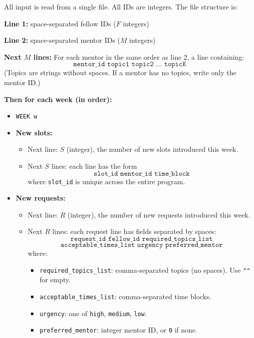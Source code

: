 \documentclass[12pt]{article}
\begin{document}
All input is read from a single file. All IDs are integers. The file structure is:

\bigskip
\noindent\textbf{Line 1:} space-separated fellow IDs ($F$ integers)

\noindent\textbf{Line 2:} space-separated mentor IDs ($M$ integers)

\noindent\textbf{Next $M$ lines:} For each mentor in the same order as line 2, a line containing:
\[
\texttt{mentor\_id topic1 topic2 ... topicK}
\]
(Topics are strings without spaces. If a mentor has no topics, write only the mentor ID.)

\bigskip

\noindent\textbf{Then for each week (in order):}

\begin{itemize}
    \item \texttt{WEEK w}

    \item \textbf{New slots:}
    \begin{itemize}
        \item Next line: $S$ (integer), the number of new slots introduced this week.
        \item Next $S$ lines: each line has the form
        \[
        \texttt{slot\_id mentor\_id time\_block}
        \]
        where \texttt{slot\_id} is unique across the entire program.
    \end{itemize}

    \item \textbf{New requests:}
    \begin{itemize}
        \item Next line: $R$ (integer), the number of new requests introduced this week.
        \item Next $R$ lines: each request line has fields separated by spaces:
        \[
        \texttt{request\_id fellow\_id required\_topics\_list}
        \]
        \[
        \texttt{acceptable\_times\_list urgency preferred\_mentor}
        \]
        where:
        \begin{itemize}
            \item \texttt{required\_topics\_list}: comma-separated topics (no spaces). Use \texttt{""} for empty.
            \item \texttt{acceptable\_times\_list}: comma-separated time blocks.
            \item \texttt{urgency}: one of \texttt{high}, \texttt{medium}, \texttt{low}.
            \item \texttt{preferred\_mentor}: integer mentor ID, or \texttt{0} if none.
        \end{itemize}
    \end{itemize}


\end{itemize}
\end{document}
